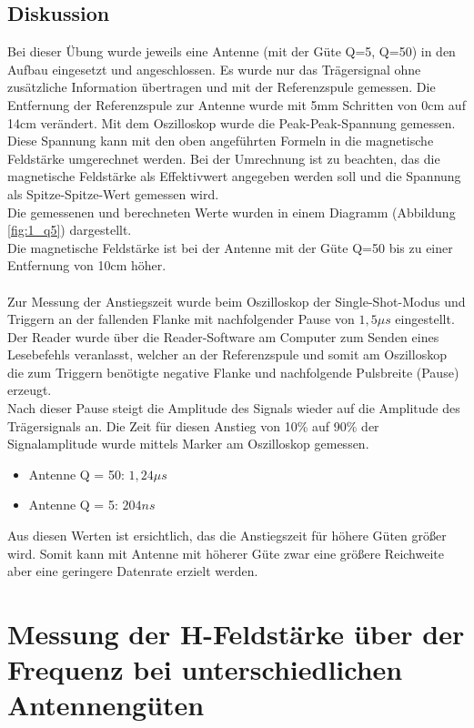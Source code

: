 \documentclass[12pt,a4paper,ngerman]{article}
\begin{document}
\subsection{Diskussion}
Bei dieser Übung wurde jeweils eine Antenne (mit der Güte Q=5, Q=50) in den Aufbau eingesetzt und angeschlossen. Es wurde nur das Trägersignal ohne zusätzliche Information übertragen und mit der Referenzspule gemessen. Die Entfernung der Referenzspule zur Antenne wurde mit 5mm Schritten von 0cm auf 14cm verändert. Mit dem Oszilloskop wurde die Peak-Peak-Spannung gemessen.\\
Diese Spannung kann mit den oben angeführten Formeln in die magnetische Feldstärke umgerechnet werden. Bei der Umrechnung ist zu beachten, das die magnetische Feldstärke als Effektivwert angegeben werden soll und die Spannung als Spitze-Spitze-Wert gemessen wird.\\
Die gemessenen und berechneten Werte wurden in einem Diagramm (Abbildung \ref{fig:1_q5}) dargestellt.\\
Die magnetische Feldstärke ist bei der Antenne mit der Güte Q=50 bis zu einer Entfernung von 10cm höher.\\
\\
Zur Messung der Anstiegszeit wurde beim Oszilloskop der Single-Shot-Modus und Triggern an der fallenden Flanke mit nachfolgender Pause von $1,5\mu s$ eingestellt.\\
Der Reader wurde über die Reader-Software am Computer zum Senden eines Lesebefehls veranlasst, welcher an der Referenzspule und somit am Oszilloskop die zum Triggern benötigte negative Flanke und nachfolgende Pulsbreite (Pause) erzeugt.\\
Nach dieser Pause steigt die Amplitude des Signals wieder auf die Amplitude des Trägersignals an. Die Zeit für diesen Anstieg von 10\% auf 90\% der Signalamplitude wurde mittels Marker am Oszilloskop gemessen.\\
\begin{itemize}
\item Antenne Q = 50: $1,24\mu s$
\item Antenne Q = 5:  $204ns$
\end{itemize}
Aus diesen Werten ist ersichtlich, das die Anstiegszeit für höhere Güten größer wird. Somit kann mit Antenne mit höherer Güte zwar eine größere Reichweite aber eine geringere Datenrate erzielt werden.


\pagebreak



\section{Messung der H-Feldstärke über der Frequenz bei unterschiedlichen Antennengüten}
\end{document}
